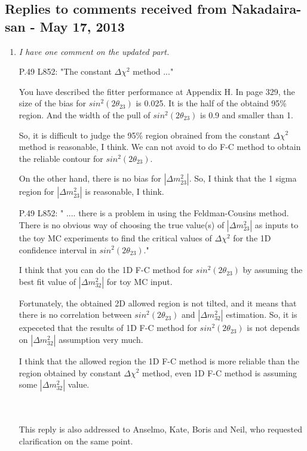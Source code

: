 \subsection{Replies to comments received from Nakadaira-san - May 17, 2013}

\begin{enumerate}
\vspace{5 mm}
\item
{\em
  I have one comment on the updated part.

  P.49 L852: "The constant $\Delta\chi^2$ method ..." 

  You have described the fitter performance at Appendix H.
  In page 329, the size of the bias for $sin^2(2 \theta_{23})$ is 0.025.
  It is the half of the obtaind 95\% region.
  And the width of the pull of $sin^2(2 \theta_{23})$ is 0.9 and smaller than 1. 

  So, it is difficult to judge the 95\% region obrained from the constant $\Delta\chi^2$ method is reasonable, I think.
  We can not avoid to do F-C method to obtain the reliable contour for $sin^2(2 \theta_{23})$.

  On the other hand, there is no bias for $|\Delta m^2_{23}|$. So, I think that the 1 sigma region for $|\Delta m^2_{23}|$ is reasonable, I think.

  P.49 L852: " .... there is a problem in using the Feldman-Cousins
  method. There is no obvious way of choosing the true
  value(s) of $|\Delta m^2_{23}|$ as inputs to the toy MC
  experiments to find the critical values of $\Delta\chi^2$ for
  the 1D confidence interval in $sin^2(2 \theta_{23})$."

  I think that you can do the 1D F-C method for $sin^2(2 \theta_{23})$ by assuming the best fit value of $|\Delta m^2_{32}|$ for toy MC input.

  Fortunately, the obtained 2D allowed region is not tilted, and it means that there is no correlation between $sin^2(2 \theta_{23})$ and
  $|\Delta m^2_{32}|$ estimation. So, it is expeceted that the results of 1D
  F-C method for $sin^2(2 \theta_{23})$ is not depends on $|\Delta m^2_{32}|$ assumption very much.

  I think that the allowed region the 1D F-C method is more reliable than the region obtained by constant $\Delta\chi^2$ method,
  even 1D F-C method is assuming some $|\Delta m^2_{32}|$ value.
}\\
\\
This reply is also addressed to Anselmo, Kate, Boris and Neil, who requested clarification on the same point.


\end{enumerate}

